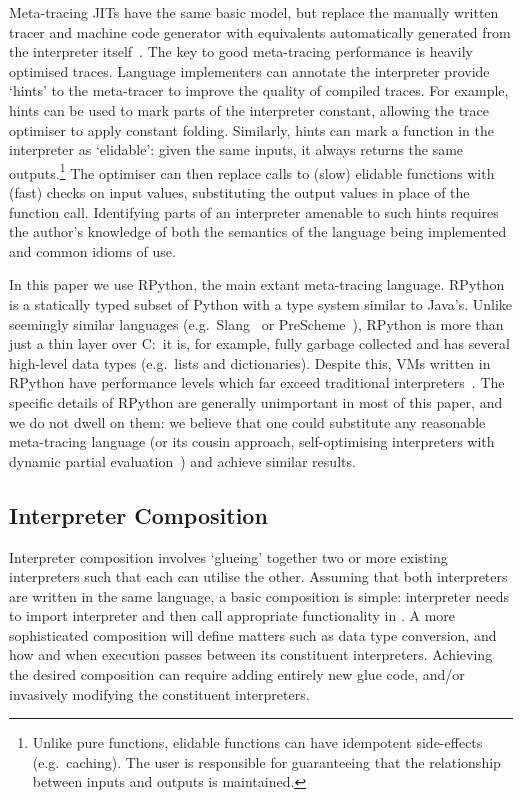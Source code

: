 \documentclass[a4paper,UKenglish]{lipics-v2016}
\begin{document}
Meta-tracing JITs have the same basic model, but replace the manually written
tracer and machine code generator with equivalents automatically generated
from the interpreter itself~\cite{mitchell70design,sullivan03dynamic,yermolovich09optimization,bebenita10spur,bolz14impact}. The key to good meta-tracing performance is heavily optimised traces. Language
implementers can annotate the interpreter provide `hints' to the meta-tracer to improve the quality of
compiled traces. For example, hints can be used to mark parts of the
interpreter constant, allowing the trace optimiser to apply constant folding.
\label{elidable functions} Similarly, hints can
mark a function in the interpreter as `elidable': given the
same inputs, it always returns the same outputs.\footnote{Unlike pure functions,
elidable functions can have idempotent side-effects (e.g.~caching). The user
is responsible for guaranteeing that the relationship between inputs and outputs is maintained.}
The optimiser can then
replace calls to (slow) elidable functions with (fast) checks on input
values, substituting the output values in place of the function call.
Identifying parts of an interpreter amenable to such hints requires the author's
knowledge of both the semantics of the language being implemented and common
idioms of use.

In this paper we use RPython, the main extant meta-tracing language. RPython
is a statically typed subset of Python with a type system similar to Java's.
Unlike seemingly similar languages
(e.g.~Slang~\cite{ingalls97back} or PreScheme~\cite{kelsey94tractable}), RPython
is more than just a thin layer over C:~it is, for example, fully garbage
collected and has several high-level data types (e.g.~lists and dictionaries).
Despite this, VMs written in RPython have performance levels which far exceed
traditional interpreters~\cite{bolz14impact}.
The specific details
of RPython are generally unimportant in most of this paper, and we do not
dwell on them: we believe that one could substitute any reasonable
meta-tracing language (or its cousin approach, self-optimising interpreters with dynamic partial
evaluation~\cite{wuerthinger13onevm}) and achieve similar results.


\subsection{Interpreter Composition}

Interpreter composition involves `glueing' together two or more existing
interpreters such that each can utilise the other. Assuming that both
interpreters are written in the same language, a basic composition
is simple: interpreter  needs to import interpreter  and then call
appropriate functionality in . A more sophisticated composition will define
matters such as data type conversion, and how and when execution passes between
its constituent interpreters. Achieving the desired composition can require
adding entirely new glue code,
and/or invasively modifying the constituent interpreters.
\end{document}
